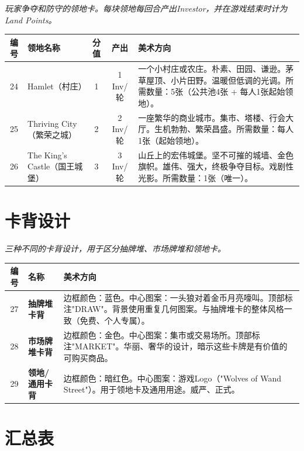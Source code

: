 \documentclass[a4paper,11pt]{article}
\begin{document}
\textit{玩家争夺和防守的领地卡。每块领地每回合产出Investor，并在游戏结束时计为Land Points。}

\begin{longtable}{@{} c p{2.2cm} c c p{5.8cm} @{}}
\toprule
\textbf{编号} & \textbf{领地名称} & \textbf{分值} & \textbf{产出} & \textbf{美术方向} \\
\midrule
\endhead
24 & Hamlet（村庄） & 1 & 1 Inv/轮 & 一个小村庄或农庄。朴素、田园、谦逊。茅草屋顶、小片田野。温暖但低调的光调。所需数量：5张（公共池4张 + 每人1张起始领地）。 \\
\midrule
25 & Thriving City（繁荣之城） & 2 & 2 Inv/轮 & 一座繁华的商业城市。集市、塔楼、行会大厅。生机勃勃、繁荣昌盛。所需数量：每人1张（起始领地）。 \\
\midrule
26 & The King's Castle（国王城堡） & 3 & 3 Inv/轮 & 山丘上的宏伟城堡。坚不可摧的城墙、金色旗帜。雄伟、强大，终极争夺目标。戏剧性光影。所需数量：1张（唯一）。 \\
\bottomrule
\end{longtable}

\section{卡背设计}

\textit{三种不同的卡背设计，用于区分抽牌堆、市场牌堆和领地卡。}

\begin{longtable}{@{} c p{2.5cm} p{8.5cm} @{}}
\toprule
\textbf{编号} & \textbf{名称} & \textbf{美术方向} \\
\midrule
\endhead
27 & \textbf{抽牌堆卡背} & 边框颜色：蓝色。中心图案：一头狼对着金币月亮嚎叫。顶部标注"DRAW"。背景使用重复几何图案。与抽牌堆卡的整体风格一致（免费、个人专属）。 \\
\midrule
28 & \textbf{市场牌堆卡背} & 边框颜色：金色。中心图案：集市或交易场所。顶部标注"MARKET"。华丽、奢华的设计，暗示这些卡牌是有价值的可购买商品。 \\
\midrule
29 & \textbf{领地/通用卡背} & 边框颜色：暗红色。中心图案：游戏Logo（"Wolves of Wand Street"）。用于领地卡及通用用途。威严、正式。 \\
\bottomrule
\end{longtable}

\newpage

\section{汇总表}
\end{document}
